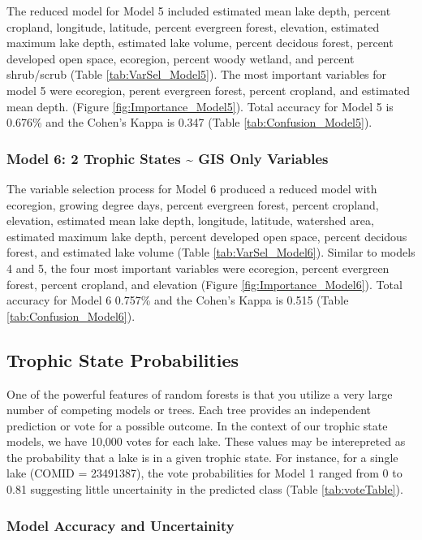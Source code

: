 \documentclass[11pt,]{article}
\begin{document}
The reduced model for Model 5 included estimated mean lake depth,
percent cropland, longitude, latitude, percent evergreen forest,
elevation, estimated maximum lake depth, estimated lake volume, percent
decidous forest, percent developed open space, ecoregion, percent woody
wetland, and percent shrub/scrub (Table \ref{tab:VarSel_Model5}). The
most important variables for model 5 were ecoregion, perent evergreen
forest, percent cropland, and estimated mean depth. (Figure
\ref{fig:Importance_Model5}). Total accuracy for Model 5 is 0.676\% and
the Cohen's Kappa is 0.347 (Table \ref{tab:Confusion_Model5}).

\subsubsection{Model 6: 2 Trophic States \textasciitilde{} GIS Only
Variables}\label{model-6-2-trophic-states-gis-only-variables}

The variable selection process for Model 6 produced a reduced model with
ecoregion, growing degree days, percent evergreen forest, percent
cropland, elevation, estimated mean lake depth, longitude, latitude,
watershed area, estimated maximum lake depth, percent developed open
space, percent decidous forest, and estimated lake volume (Table
\ref{tab:VarSel_Model6}). Similar to models 4 and 5, the four most
important variables were ecoregion, percent evergreen forest, percent
cropland, and elevation (Figure \ref{fig:Importance_Model6}). Total
accuracy for Model 6 0.757\% and the Cohen's Kappa is 0.515 (Table
\ref{tab:Confusion_Model6}).

\subsection{Trophic State
Probabilities}\label{trophic-state-probabilities}

One of the powerful features of random forests is that you utilize a
very large number of competing models or trees. Each tree provides an
independent prediction or vote for a possible outcome. In the context of
our trophic state models, we have 10,000 votes for each lake. These
values may be interepreted as the probability that a lake is in a given
trophic state. For instance, for a single lake (COMID = 23491387), the
vote probabilities for Model 1 ranged from 0 to 0.81 suggesting little
uncertainity in the predicted class (Table \ref{tab:voteTable}).

\subsubsection{Model Accuracy and
Uncertainity}\label{model-accuracy-and-uncertainity}
\end{document}
